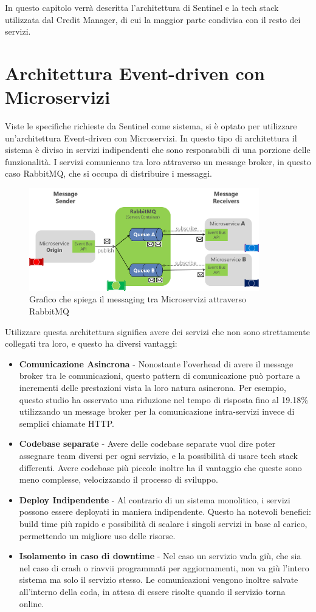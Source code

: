 In questo capitolo verr\`a descritta l'architettura di Sentinel e la tech stack utilizzata dal Credit Manager, di cui la maggior parte condivisa con il resto dei servizi.

\section{Architettura Event-driven con Microservizi}
Viste le specifiche richieste da Sentinel come sistema, si \`e optato per utilizzare un'architettura Event-driven con Microservizi.
In questo tipo di architettura il sistema \`e diviso in servizi indipendenti che sono responsabili di una porzione delle funzionalit\`a.
I servizi comunicano tra loro attraverso un message broker, in questo caso RabbitMQ, che si occupa di distribuire i messaggi.
\begin{figure}[H]
  \centering
  \includegraphics[width=10cm]{images/architecture-example.png}
  \caption{Grafico che spiega il messaging tra Microservizi attraverso RabbitMQ\cite{microsoftrabbitmq}}
\end{figure}
Utilizzare questa architettura significa avere dei servizi che non sono strettamente collegati tra loro, e questo ha diversi vantaggi:
\begin{itemize}
  \item \textbf{Comunicazione Asincrona} - Nonostante l'overhead di avere il message broker tra le comunicazioni, questo pattern di comunicazione pu\`o portare a incrementi delle prestazioni
    vista la loro natura asincrona. Per esempio, questo studio\cite{eventdrivenperformance} ha osservato una riduzione nel tempo di risposta fino al 19.18\% utilizzando un message broker per la comunicazione
    intra-servizi invece di semplici chiamate HTTP.
  \item \textbf{Codebase separate} - Avere delle codebase separate vuol dire poter assegnare team diversi per ogni servizio, e la possibilit\`a di usare tech stack differenti.
    Avere codebase pi\`u piccole inoltre ha il vantaggio che queste sono meno complesse, velocizzando il processo di sviluppo.
  \item \textbf{Deploy Indipendente} - Al contrario di un sistema monolitico, i servizi possono essere deployati in maniera indipendente.
    Questo ha notevoli benefici: build time pi\`u rapido e possibilit\`a di scalare i singoli servizi in base al carico, permettendo un migliore uso delle
    risorse.
  \item \textbf{Isolamento in caso di downtime} - Nel caso un servizio vada gi\`u, che sia nel caso di crash o riavvii programmati per aggiornamenti, non va gi\`u l'intero sistema
    ma solo il servizio stesso. Le comunicazioni vengono inoltre salvate all'interno della coda, in attesa di essere risolte quando il servizio torna online.
\end{itemize}
